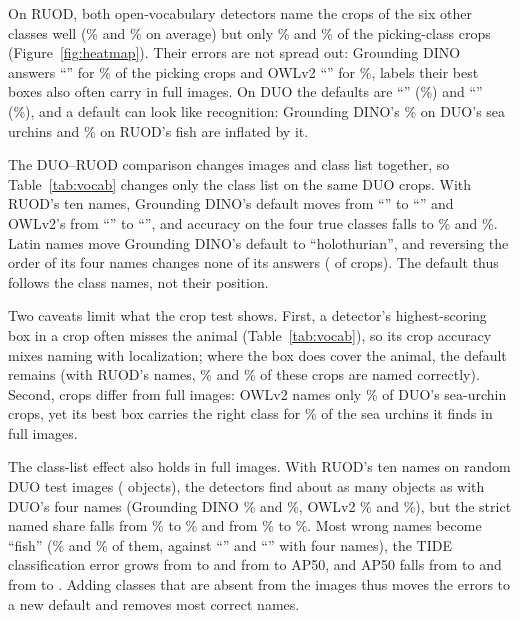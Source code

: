 \documentclass[letterpaper]{article} %
\begin{document}


On RUOD, both open-vocabulary detectors name the crops of the six other classes well (\rCropOthGD\% and \rCropOthOWL\% on average) but only \rCropSeaGD\% and \rCropSeaOWL\% of the picking-class crops (Figure~\ref{fig:heatmap}). Their errors are not spread out: Grounding DINO answers ``\dlRuodLabGD'' for \dlRuodGD\% of the picking crops and OWLv2 ``\dlRuodLabOWL'' for \dlRuodOWL\%, labels their best boxes also often carry in full images. On DUO the defaults are ``\dlDuoLabGD'' (\dlDuoGD\%) and ``\dlDuoLabOWL'' (\dlDuoOWL\%), and a default can look like recognition: Grounding DINO's \cropUrchGD\% on DUO's sea urchins and \rCropFishGD\% on RUOD's fish are inflated by it.

The DUO--RUOD comparison changes images and class list together, so Table~\ref{tab:vocab} changes only the class list on the same DUO crops. With RUOD's ten names, Grounding DINO's default moves from ``\vTopLabGDfour'' to ``\vTopLabGDten'' and OWLv2's from ``\vTopLabOWLfour'' to ``\vTopLabOWLten'', and accuracy on the four true classes falls to \vAccGDten\% and \vAccOWLten\%. Latin names move Grounding DINO's default to ``holothurian'', and reversing the order of its four names changes none of its answers (\vRevSame{} of \vRevN{} crops). The default thus follows the class names, not their position.

Two caveats limit what the crop test shows. First, a detector's highest-scoring box in a crop often misses the animal (Table~\ref{tab:vocab}), so its crop accuracy mixes naming with localization; where the box does cover the animal, the default remains (with RUOD's names, \vCovCorGDten\% and \vCovCorOWLten\% of these crops are named correctly). Second, crops differ from full images: OWLv2 names only \cropUrchOWL\% of DUO's sea-urchin crops, yet its best box carries the right class for \urchBestOWL\% of the sea urchins it finds in full images.

The class-list effect also holds in full images. With RUOD's ten names on \fvImages{} random DUO test images (\fvObjects{} objects), the detectors find about as many objects as with DUO's four names (Grounding DINO \fvFoundGDfour\% and \fvFoundGDten\%, OWLv2 \fvFoundOWLfour\% and \fvFoundOWLten\%), but the strict named share falls from \fvNamedGDfour\% to \fvNamedGDten\% and from \fvNamedOWLfour\% to \fvNamedOWLten\%. Most wrong names become ``fish'' (\fvTopGDten\% and \fvTopOWLten\% of them, against ``\fvTopLabGDfour'' and ``\fvTopLabOWLfour'' with four names), the TIDE classification error grows from \fvClsGDfour{} to \fvClsGDten{} and from \fvClsOWLfour{} to \fvClsOWLten{} AP50, and AP50 falls from \fvApGDfour{} to \fvApGDten{} and from \fvApOWLfour{} to \fvApOWLten. Adding classes that are absent from the images thus moves the errors to a new default and removes most correct names.
\end{document}
